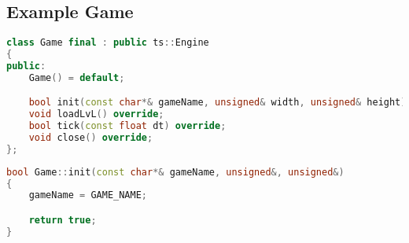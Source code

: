 \newpage

\subsection{Example Game}

\begin{lstlisting}[language=c++, caption=Example of Game class header (./game/game.h)]
class Game final : public ts::Engine
{
public:
    Game() = default;

    bool init(const char*& gameName, unsigned& width, unsigned& height) override;
    void loadLvL() override;
    bool tick(const float dt) override;
    void close() override;
};
\end{lstlisting}

\begin{lstlisting}[language=c++, caption=Example of Game's init function (./game/game.cpp)]
bool Game::init(const char*& gameName, unsigned&, unsigned&)
{
    gameName = GAME_NAME;

    return true;
}
\end{lstlisting}

